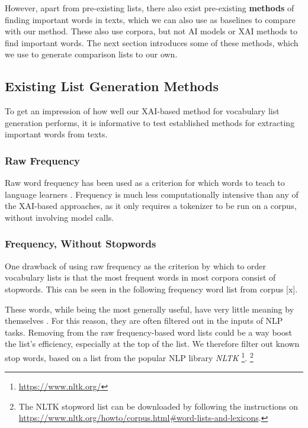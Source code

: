 However, apart from pre-existing lists, there also exist pre-existing \textbf{methods} of finding important words in texts, which we can also use as baselines to compare with our method.
These also use corpora, but not AI models or XAI methods to find important words.
The next section introduces some of these methods, which we use to generate comparison lists to our own.


\subsection{Existing List Generation Methods}
To get an impression of how well our XAI-based method for vocabulary list generation performs, it is informative to test established methods for extracting important words from texts.

\subsubsection{Raw Frequency}

Raw word frequency has been used as a criterion for which words to teach to language learners \cite{heChoosingWordsTeach2019}.
Frequency is much less computationally intensive than any of the XAI-based approaches, as it only requires a tokenizer to be run on a corpus, without involving model calls.

\subsubsection{Frequency, Without Stopwords}
One drawback of using raw frequency as the criterion by which to order vocabulary lists is that the most frequent words in most corpora consist of stopwords.
This can be seen in the following frequency word list from corpus [x].

These words, while being the most generally useful, have very little meaning by themselves \cite{rajaraman2011data}.
For this reason, they are often filtered out in the inputs of NLP tasks.
Removing from the raw frequency-based word lists could be a way boost the list's  efficiency, especially at the top of the list.
We therefore filter out known stop words, based on a list from the popular NLP library \textit{NLTK} \footnote{\url{https://www.nltk.org/}}.
\footnote{The NLTK stopword list can be downloaded by following the instructions on \url{https://www.nltk.org/howto/corpus.html\#word-lists-and-lexicons}.}


